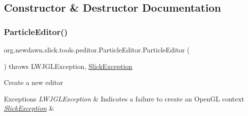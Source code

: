 \subsection{Constructor \& Destructor Documentation}
\mbox{\label{classorg_1_1newdawn_1_1slick_1_1tools_1_1peditor_1_1_particle_editor_a2e3d19ba973d23e1cf009aa706c8aa28}} 
\subsubsection{\texorpdfstring{Particle\+Editor()}{ParticleEditor()}}
{\footnotesize\ttfamily org.\+newdawn.\+slick.\+tools.\+peditor.\+Particle\+Editor.\+Particle\+Editor (\begin{DoxyParamCaption}{ }\end{DoxyParamCaption}) throws L\+W\+J\+G\+L\+Exception, \mbox{\hyperlink{classorg_1_1newdawn_1_1slick_1_1_slick_exception}{Slick\+Exception}}\hspace{0.3cm}{\ttfamily [inline]}}

Create a new editor


\begin{DoxyExceptions}{Exceptions}
{\em L\+W\+J\+G\+L\+Exception} & Indicates a failure to create an Open\+GL context \\
\hline
{\em \mbox{\hyperlink{classorg_1_1newdawn_1_1slick_1_1_slick_exception}{Slick\+Exception}}} & \\
\hline
\end{DoxyExceptions}

